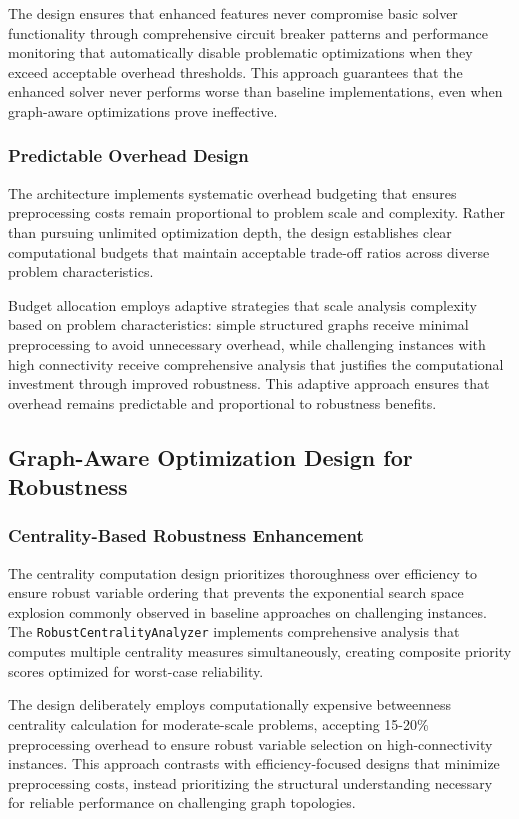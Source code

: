 The design ensures that enhanced features never compromise basic solver functionality through comprehensive circuit breaker patterns and performance monitoring that automatically disable problematic optimizations when they exceed acceptable overhead thresholds. This approach guarantees that the enhanced solver never performs worse than baseline implementations, even when graph-aware optimizations prove ineffective.

\subsubsection{Predictable Overhead Design}

The architecture implements systematic overhead budgeting that ensures preprocessing costs remain proportional to problem scale and complexity. Rather than pursuing unlimited optimization depth, the design establishes clear computational budgets that maintain acceptable trade-off ratios across diverse problem characteristics.

Budget allocation employs adaptive strategies that scale analysis complexity based on problem characteristics: simple structured graphs receive minimal preprocessing to avoid unnecessary overhead, while challenging instances with high connectivity receive comprehensive analysis that justifies the computational investment through improved robustness. This adaptive approach ensures that overhead remains predictable and proportional to robustness benefits.

\subsection{Graph-Aware Optimization Design for Robustness}

\subsubsection{Centrality-Based Robustness Enhancement}

The centrality computation design prioritizes thoroughness over efficiency to ensure robust variable ordering that prevents the exponential search space explosion commonly observed in baseline approaches on challenging instances. The \texttt{RobustCentralityAnalyzer} implements comprehensive analysis that computes multiple centrality measures simultaneously, creating composite priority scores optimized for worst-case reliability.

The design deliberately employs computationally expensive betweenness centrality calculation for moderate-scale problems, accepting 15-20\% preprocessing overhead to ensure robust variable selection on high-connectivity instances. This approach contrasts with efficiency-focused designs that minimize preprocessing costs, instead prioritizing the structural understanding necessary for reliable performance on challenging graph topologies.

